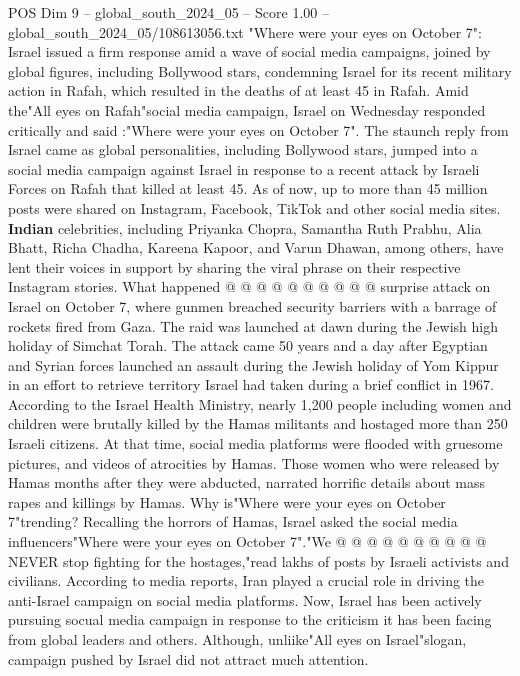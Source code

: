 \begin{textsample}{POS Dim 9 – global\_south\_2024\_05 – Score 1.00 – global\_south\_2024\_05/108613056.txt}  \label{ex:f9_pos_043}
"Where were your eyes on October 7": Israel issued a firm response amid a wave of social media campaigns, joined by global figures, including Bollywood stars, condemning Israel for its recent military action in Rafah, which resulted in the deaths of at least 45 in Rafah.
Amid the"All eyes on Rafah"social media campaign, Israel on Wednesday responded critically and said :"Where were your eyes on October 7".
The staunch reply from Israel came as global personalities, including Bollywood stars, jumped into a social media campaign against Israel in response to a recent attack by Israeli Forces on Rafah that killed at least 45.
As of now, up to more than 45 million posts were shared on Instagram, Facebook, TikTok and other social media sites. \textbf{Indian} celebrities, including Priyanka Chopra, Samantha Ruth Prabhu, Alia Bhatt, Richa Chadha, Kareena Kapoor, and Varun Dhawan, among others, have lent their voices in support by sharing the viral phrase on their respective Instagram stories.
What happened @ @ @ @ @ @ @ @ @ @ surprise attack on Israel on October 7, where gunmen breached security barriers with a barrage of rockets fired from Gaza.
The raid was launched at dawn during the Jewish high holiday of Simchat Torah.
The attack came 50 years and a day after Egyptian and Syrian forces launched an assault during the Jewish holiday of Yom Kippur in an effort to retrieve territory Israel had taken during a brief conflict in 1967.
According to the Israel Health Ministry, nearly 1,200 people including women and children were brutally killed by the Hamas militants and hostaged more than 250 Israeli citizens.
At that time, social media platforms were flooded with gruesome pictures, and videos of atrocities by Hamas.
Those women who were released by Hamas months after they were abducted, narrated horrific details about mass rapes and killings by Hamas.
Why is"Where were your eyes on October 7"trending?
Recalling the horrors of Hamas, Israel asked the social media influencers"Where were your eyes on October 7"."We @ @ @ @ @ @ @ @ @ @ NEVER stop fighting for the hostages,"read lakhs of posts by Israeli activists and civilians.
According to media reports, Iran played a crucial role in driving the anti-Israel campaign on social media platforms.
Now, Israel has been actively pursuing socual media campaign in response to the criticism it has been facing from global leaders and others.
Although, unliike"All eyes on Israel"slogan, campaign pushed by Israel did not attract much attention.

\end{textsample}
